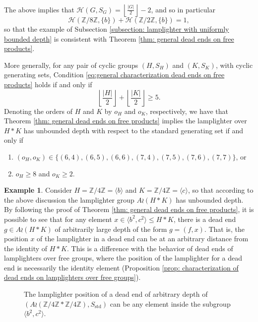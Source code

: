 \documentclass[reqno,oneside]{amsart}
\newcommand{\Z}{\mathbb{Z}}
\newcommand{\std}{S_{\mathrm{std}}}
\theoremstyle{plain}
\theoremstyle{definition}
\newtheorem{exmp}[thm]{Example} %
\begin{document}
The above implies that $\displaystyle \mathscr{H}(G,S_G)=\left\lfloor \frac{|G|}{2}\right\rfloor-2$, and so in particular
$$
\mathscr{H}(\Z/8\Z,\{b\})+\mathscr{H}(\Z/2\Z,\{b\})=1,
$$
so that the example of Subsection \ref{subsection: lamplighter with uniformly bounded depth} is consistent with Theorem \ref{thm: general dead ends on free products}.

More generally, for any pair of cyclic groups $(H,S_H)$ and $(K,S_K)$, with cyclic generating sets, Condition \eqref{eq:general characterization dead ends on free products} holds if and only if
$$
\left\lfloor\frac{|H|}{2} \right\rfloor+\left\lfloor\frac{|K|}{2} \right\rfloor\ge 5.
$$
Denoting the orders of $H$ and $K$ by $o_H$ and $o_K$, respectively, we have that Theorem \ref{thm: general dead ends on free products} implies the lamplighter over $H*K$ has unbounded depth with respect to the standard generating set if and only if
\begin{enumerate}
	\item $(o_H,o_K)\in \{(6,4),(6,5),(6,6),(7,4),(7,5),(7,6),(7,7)\}$, or
	\item  $o_H\ge 8$ and $o_K\ge 2$.
\end{enumerate} 

\begin{exmp}\label{example: free product unbounded depth arbitrarily far away position} Consider $H=\Z/4\Z=\langle b\rangle$ and $K=\Z/4\Z=\langle c \rangle$, so that according to the above discussion the lamplighter group $A\wr (H*K)$ has unbounded depth. By following the proof of Theorem \ref{thm: general dead ends on free products}, it is possible to see that for any element $x\in \langle b^2,c^2\rangle\leqslant H*K$, there is a dead end $g\in A\wr (H*K)$ of arbitrarily large depth of the form $g=(f,x)$. That is, the position $x$ of the lamplighter in a dead end can be at an arbitrary distance from the identity of $H*K$. This is a difference with the behavior of dead ends of lamplighters over free groups, where the position of the lamplighter for a dead end is necessarily the identity element (Proposition \ref{prop: characterization of dead ends on lamplighters over free groups}).
	\begin{figure}[h!]
		\centering
		
		\caption{The lamplighter position of a dead end of arbitrary depth of \\ $(A\wr (\Z/4\Z*\Z/4\Z),\std)$ can be any element inside the subgroup $\langle b^2,c^2\rangle$.}
		\label{fig: Z/4Z*Z/4Z possible positions for lamplighter in a dead end}
	\end{figure}
\end{exmp}
\end{document}
